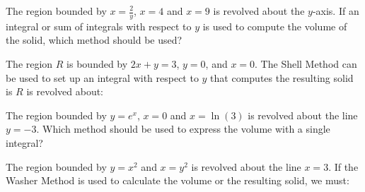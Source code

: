 \documentclass[handout]{ximera}
\author{Jim Talamo}
\begin{document}
\begin{exercise}
 The region bounded by $x=\frac{2}{y}$, $x=4$ and $x=9$ is revolved about the $y$-axis.  If an integral or sum of integrals with respect to $y$ is used to compute the volume of the solid, which method should be used?
 
\begin{multipleChoice}
\end{multipleChoice}

\end{exercise}


\begin{exercise}
 The region $R$ is bounded by $2x+y=3$, $y=0$, and $x=0$.  The Shell Method can be used to set up an integral with respect to $y$ that computes the resulting solid is $R$ is revolved about:
 
 
\begin{multipleChoice}
\end{multipleChoice}

\end{exercise}

\begin{exercise}
 The region bounded by $y=e^x$, $x=0$ and $x=\ln(3)$ is revolved about the line $y=-3$.  Which method should be used to express the volume with a single integral?

\begin{multipleChoice}
\end{multipleChoice}

\end{exercise}

\begin{exercise}
 The region bounded by $y=x^2$ and $x=y^2$ is revolved about the line $x=3$.  If the Washer Method is used to calculate the volume or the resulting solid, we must:
 
\begin{multipleChoice}
\end{multipleChoice}

\end{exercise}
\end{document}

